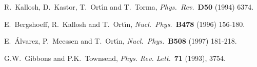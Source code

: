 \documentclass[12pt,a4paper]{article}
\begin{document}
\begin{thebibliography}{99}
 R.~Kallosh, D.~Kastor, T.~Ort\'{\i}n and T.~Torma,
                   {\it Phys.~Rev.}~{\bf D50} (1994) 6374.

 E.~Bergshoeff, R.~Kallosh and T.~Ort\'{\i}n,
                   {\it Nucl.~Phys.}~{\bf B478} (1996) 156-180.

 E.~\'Alvarez, P.~Meessen and T.~Ort\'{\i}n,
                  {\it Nucl.~Phys.}~{\bf B508} (1997) 181-218.


 G.W.~Gibbons and P.K.~Townsend,
                      {\it Phys. Rev. Lett.}~{\bf 71} (1993), 3754.







\end{thebibliography}
\end{document}

